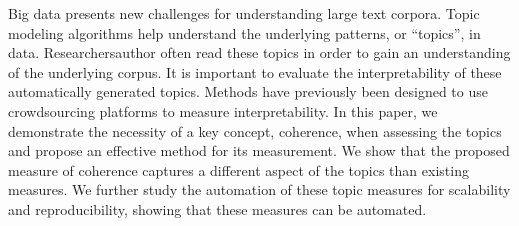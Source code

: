 Big data presents new challenges for understanding large text corpora. Topic modeling algorithms help understand the underlying patterns, or ``topics'', in data. Researchersauthor often read these topics in order to gain an understanding of the underlying corpus. It is important to evaluate the interpretability of these automatically generated topics. Methods have previously been designed to use crowdsourcing platforms to measure interpretability. In this paper, we demonstrate the necessity of a key concept, coherence, when assessing the topics and propose an effective method for its measurement. We show that the proposed measure of coherence captures a different aspect of the topics than existing measures. We further study the automation of these topic measures for scalability and reproducibility, showing that these measures can be automated.
